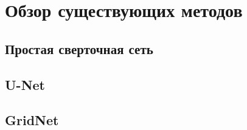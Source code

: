 \section{Обзор существующих методов}

\subsection{Простая сверточная сеть}

\subsection{U-Net}

\subsection{GridNet}
